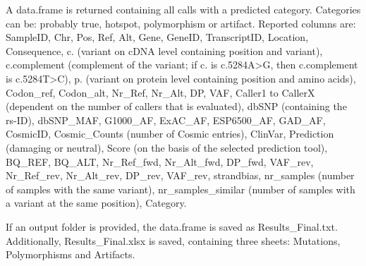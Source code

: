 \documentclass{article}
\begin{document}
A data.frame is returned containing all calls with a predicted category. Categories can be: probably true, hotspot, polymorphism or artifact. Reported columns are: SampleID, Chr, Pos, Ref, Alt, Gene, GeneID, TranscriptID, Location, Consequence, c. (variant on cDNA level containing position and variant), c.complement (complement of the variant; if c. is c.5284A>G, then c.complement is c.5284T>C), p. (variant on protein level containing position and amino acids), Codon\_ref, Codon\_alt, Nr\_Ref, Nr\_Alt, DP, VAF, Caller1 to CallerX (dependent on the number of callers that is evaluated), dbSNP (containing the rs-ID), dbSNP\_MAF, G1000\_AF, ExAC\_AF, ESP6500\_AF, GAD\_AF, CosmicID, Cosmic\_Counts (number of Cosmic entries), ClinVar, Prediction (damaging or neutral), Score (on the basis of the selected prediction tool), BQ\_REF, BQ\_ALT, Nr\_Ref\_fwd, Nr\_Alt\_fwd, DP\_fwd, VAF\_rev, Nr\_Ref\_rev, Nr\_Alt\_rev, DP\_rev, VAF\_rev, strandbias, nr\_samples (number of samples with the same variant), nr\_samples\_similar (number of samples with a variant at the same position), Category.

If an output folder is provided, the data.frame is saved as Results\_Final.txt. Additionally, Results\_Final.xlsx is saved, containing three sheets: Mutations, Polymorphisms and Artifacts.
\end{document}
